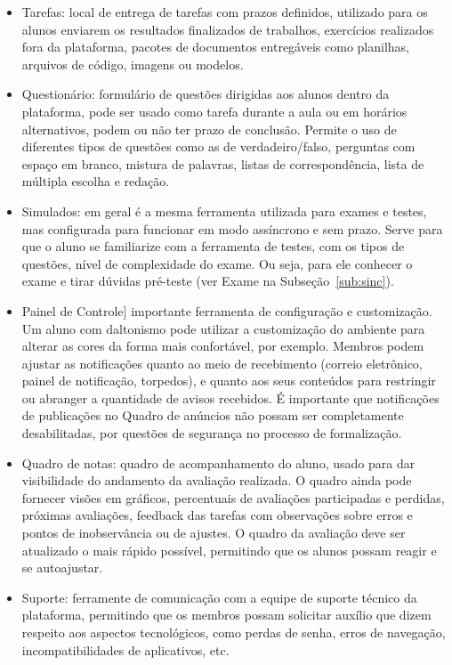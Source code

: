 \begin{itemize}
\item Tarefas: local de entrega de tarefas com prazos definidos, utilizado para os alunos enviarem os resultados finalizados de trabalhos, exercícios realizados fora da plataforma, pacotes de documentos entregáveis como planilhas, arquivos de código, imagens ou modelos. 
\item Questionário: formulário de questões dirigidas aos alunos dentro da plataforma, pode ser usado como tarefa durante a aula ou em horários alternativos, podem ou não ter prazo de conclusão. Permite o uso de diferentes tipos de questões como as de verdadeiro/falso, perguntas com espaço em branco, mistura de palavras, listas de correspondência, lista de múltipla escolha e redação.  
\item Simulados: em geral é a mesma ferramenta utilizada para exames e testes, mas configurada para funcionar em modo assíncrono e sem prazo. Serve para que o aluno se familiarize com a ferramenta de testes, com os tipos de questões, nível de complexidade do exame. Ou seja, para ele conhecer o exame e tirar dúvidas pré-teste (ver Exame na Subseção~\ref{sub:sinc}).
\item Painel de Controle] importante ferramenta de configuração e customização. Um aluno com daltonismo pode utilizar a customização do ambiente para alterar as cores da forma mais confortável, por exemplo. Membros podem ajustar as notificações quanto ao meio de recebimento (correio eletrônico, painel de notificação, torpedos), e quanto aos seus conteúdos para restringir ou abranger a quantidade de avisos recebidos. É importante que notificações de publicações no Quadro de anúncios não possam ser completamente desabilitadas, por questões de segurança no processo de formalização.
\item Quadro de notas: quadro de acompanhamento do aluno, usado para dar visibilidade do andamento da avaliação realizada. O quadro ainda pode fornecer visões em gráficos, percentuais de avaliações participadas e perdidas, próximas avaliações, feedback das tarefas com observações sobre erros e pontos de inobservância ou de ajustes. O quadro da avaliação deve ser atualizado o mais rápido possível, permitindo que os alunos possam reagir e se autoajustar.
\item Suporte:  ferramente de comunicação com a equipe de suporte técnico da plataforma, permitindo que os membros possam solicitar auxílio que dizem respeito aos aspectos tecnológicos, como perdas de senha, erros de navegação, incompatibilidades de aplicativos, etc.
\end{itemize}

